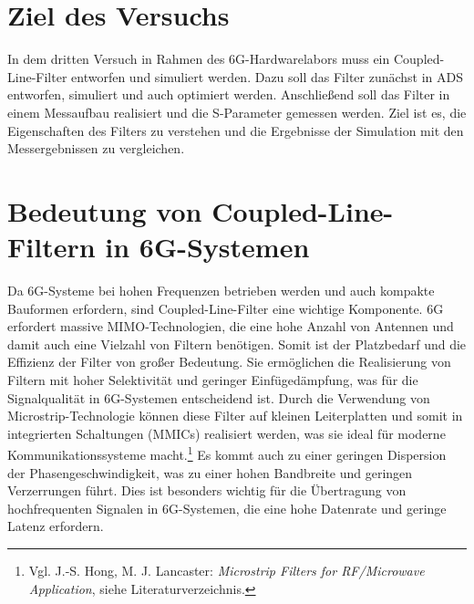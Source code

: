 \section{Ziel des Versuchs}
    In dem dritten Versuch in Rahmen des 6G-Hardwarelabors muss ein Coupled-Line-Filter entworfen und simuliert werden. Dazu soll das Filter zunächst in ADS entworfen, simuliert und auch optimiert werden. 
    Anschließend soll das Filter in einem Messaufbau realisiert und die S-Parameter gemessen werden. Ziel ist es, die Eigenschaften des Filters zu verstehen und die Ergebnisse der Simulation mit den Messergebnissen zu vergleichen.
\section{Bedeutung von Coupled-Line-Filtern in 6G-Systemen}
    Da 6G-Systeme bei hohen Frequenzen betrieben werden und auch kompakte Bauformen erfordern, sind Coupled-Line-Filter eine wichtige Komponente. 6G erfordert massive MIMO-Technologien, die eine hohe Anzahl von Antennen und damit auch eine Vielzahl von Filtern benötigen.
    Somit ist der Platzbedarf und die Effizienz der Filter von großer Bedeutung.
    Sie ermöglichen die Realisierung von Filtern mit hoher Selektivität und geringer Einfügedämpfung, was für die Signalqualität in 6G-Systemen entscheidend ist.
    Durch die Verwendung von Microstrip-Technologie können diese Filter auf kleinen Leiterplatten und somit in integrierten Schaltungen (MMICs) realisiert werden, was sie ideal für moderne Kommunikationssysteme macht.\footnote{Vgl. J.-S. Hong, M. J. Lancaster: \textit{Microstrip Filters for RF/Microwave Application}, siehe Literaturverzeichnis.}
    Es kommt auch zu einer geringen Dispersion der Phasengeschwindigkeit, was zu einer hohen Bandbreite und geringen Verzerrungen führt. Dies ist besonders wichtig für die Übertragung von hochfrequenten Signalen in 6G-Systemen, die eine hohe Datenrate und geringe Latenz erfordern.
\clearpage